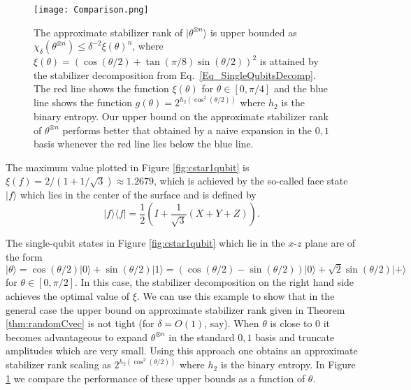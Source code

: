 \begin{figure}[t]
\centering
\texttt{[image: Comparison.png]}
\caption{The approximate stabilizer rank of $|\theta^{\otimes n}\rangle$ is upper bounded as $\chi_\delta(\theta^{\otimes n})\leq \delta^{-2}\xi(\theta)^{n}$, where $\xi(\theta)=(\cos(\theta/2)+\tan(\pi/8)\sin(\theta/2))^2$ is attained by the stabilizer decomposition from Eq.~\eqref{Eq_SingleQubitsDecomp}. The red line shows the function $\xi(\theta)$ for $\theta \in [0,\pi/4]$ and the blue line shows the function $g(\theta)=2^{h_2(\cos^2(\theta/2))}$ where $h_2$ is the binary entropy.  Our upper bound on the approximate stabilizer rank of $\theta^{\otimes n}$ performs better that obtained by a naive expansion in the $0,1$ basis whenever the red line lies below the blue line.}
\label{fig:redblue}
\end{figure}

The maximum value plotted in Figure \ref{fig:cstar1qubit} is $\xi(f)=2/(1+1/\sqrt{3})\approx 1.2679$, which is achieved by the so-called face state $|f\rangle$ which lies in the center of the surface and is defined by
\[
|f\rangle\langle f|=\frac{1}{2}\left(I+\frac{1}{\sqrt{3}}(X+Y+Z)\right).
\]

The single-qubit states in Figure \ref{fig:cstar1qubit} which lie in the $x$-$z$ plane are of the form
\begin{equation}
	\label{Eq_SingleQubitsDecomp}
|\theta\rangle=\cos(\theta/2)|0\rangle+\sin(\theta/2)|1\rangle= \left(\cos(\theta/2)-\sin(\theta/2)\right)|0\rangle+\sqrt{2}\sin(\theta/2)|+\rangle
\end{equation}
for $\theta\in [0,\pi/2]$. In this case, the stabilizer decomposition on the right hand side achieves the optimal value of $\xi$. We can use this example to show that in the general case the upper bound on approximate stabilizer rank given in Theorem \ref{thm:randomCvec} is not tight (for $\delta=O(1)$, say). When $\theta$ is close to $0$ it becomes advantageous to expand $\theta^{\otimes n}$ in the standard $0,1$ basis and truncate amplitudes which are very small. Using this approach one obtains an approximate stabilizer rank scaling as $2^{h_2(\cos^2(\theta/2))}$ where $h_2$ is the binary entropy. In Figure \ref{fig:redblue} we compare the performance of these upper bounds as a function of  $\theta$. 

